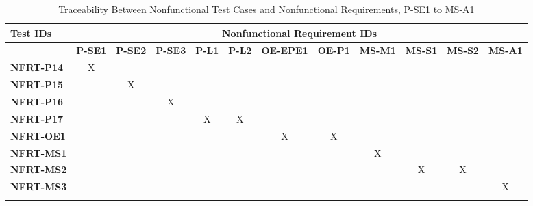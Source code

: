 \documentclass[12pt, titlepage]{article}
\begin{document}
\begin{landscape}
\begin{longtable}{|l|ccccccccccc|}
  \hline
  \textbf{Test IDs} & \multicolumn{11}{c|}{\textbf{Nonfunctional Requirement IDs}} \\
  \hline
  ~                 & \textbf{P-SE1} & \textbf{P-SE2} & \textbf{P-SE3} & \textbf{P-L1} & \textbf{P-L2} & \textbf{OE-EPE1} & \textbf{OE-P1} & \textbf{MS-M1} & \textbf{MS-S1} & \textbf{MS-S2} & \textbf{MS-A1} \\
  \hline
  \textbf{NFRT-P14} & X              & ~              & ~              & ~             & ~             & ~                & ~              & ~              & ~              & ~              &~               \\
  \textbf{NFRT-P15} & ~              & X              & ~              & ~             & ~             & ~                & ~              & ~              & ~              & ~              &~               \\
  \textbf{NFRT-P16} & ~              & ~              & X              & ~             & ~             & ~                & ~              & ~              & ~              & ~              &~               \\
  \textbf{NFRT-P17} & ~              & ~              & ~              & X             & X             & ~                & ~              & ~              & ~              & ~              &~               \\
  \textbf{NFRT-OE1} & ~              & ~              & ~              & ~             & ~             & X                & X              & ~              & ~              & ~              &~               \\
  \textbf{NFRT-MS1} & ~              & ~              & ~              & ~             & ~             & ~                & ~              & X              & ~              & ~              &~               \\
  \textbf{NFRT-MS2} & ~              & ~              & ~              & ~             & ~             & ~                & ~              & ~              & X              &X               &~               \\
  \textbf{NFRT-MS3} & ~              & ~              & ~              & ~             & ~             & ~                & ~              & ~              & ~              &~               &X               \\
  \hline
\caption{Traceability Between Nonfunctional Test Cases and Nonfunctional Requirements, P-SE1 to MS-A1} \\
\end{longtable}


\end{landscape}
\end{document}
